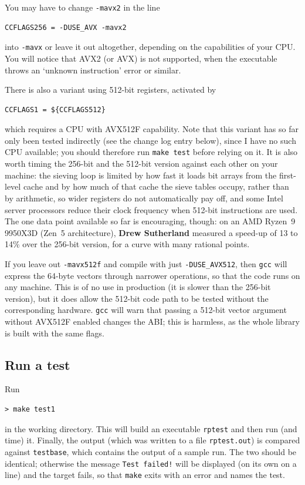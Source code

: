 \documentclass[12pt,a4paper,oneside]{amsart}
\begin{document}
You may have to change \verb+-mavx2+ in the line
\begin{verbatim}
CCFLAGS256 = -DUSE_AVX -mavx2
\end{verbatim}
into \verb+-mavx+ or leave it out altogether, depending on the capabilities
of your CPU. You will notice that AVX2 (or AVX) is not supported, when the
executable throws an `unknown instruction' error or similar.

There is also a variant using 512-bit registers, activated by
\begin{verbatim}
CCFLAGS1 = ${CCFLAGS512}
\end{verbatim}
which requires a CPU with AVX512F capability. Note that this variant has
so far only been tested indirectly (see the change log entry below), since
I have no such CPU available; you should therefore run \texttt{make test}
before relying on it. It is also worth timing the 256-bit and the 512-bit
version against each other on your machine: the sieving loop is limited by
how fast it loads bit arrays from the first-level cache and by how much of
that cache the sieve tables occupy, rather than by arithmetic, so wider
registers do not automatically pay off, and some Intel server processors reduce their clock
frequency when 512-bit instructions are used. The one data point available
so far is encouraging, though: on an AMD Ryzen~9 9950X3D (Zen~5 architecture),
\textbf{Drew Sutherland} measured a speed-up of 13 to 14\% over the 256-bit
version, for a curve with many rational points.

If you leave out \verb+-mavx512f+ and compile with just
\verb+-DUSE_AVX512+, then \texttt{gcc} will express the 64-byte vectors
through narrower operations, so that the code runs on any machine. This is
of no use in production (it is slower than the 256-bit version), but it
does allow the 512-bit code path to be tested without the corresponding
hardware. \texttt{gcc} will warn that passing a 512-bit vector argument
without AVX512F enabled changes the ABI; this is harmless, as the whole
library is built with the same flags.

\subsection{Run a test}

Run

\begin{verbatim}
> make test1
\end{verbatim}

in the working directory. This will build an executable \texttt{rptest} and
then run (and time) it. Finally, the output (which was written to a file
\texttt{rptest.out}) is compared against \texttt{testbase}, which contains the
output of a sample run. The two should be identical; otherwise the
message \texttt{Test failed!} will be displayed (on its own on a line) and
the target fails, so that \texttt{make} exits with an error and names the
test.
\end{document}
